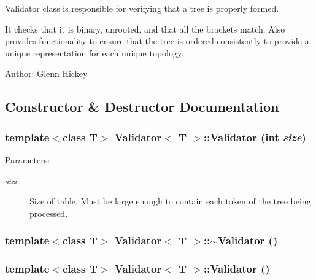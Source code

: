 Validator class is responsible for verifying that a tree is properly formed. 

It checks that it is binary, unrooted, and that all the brackets match. Also provides functionality to ensure that the tree is ordered consistently to provide a unique representation for each unique topology.

\begin{Desc}
\item[Author:]Glenn Hickey \end{Desc}




\subsection{Constructor \& Destructor Documentation}
\subsubsection{\setlength{\rightskip}{0pt plus 5cm}template$<$class T$>$ {\bf Validator}$<$ T $>$::{\bf Validator} (int {\em size})}\label{classValidator_a0}


\begin{Desc}
\item[Parameters:]
\begin{description}
\item[{\em size}]Size of table. Must be large enough to contain each token of the tree being processed. \end{description}
\end{Desc}
\subsubsection{\setlength{\rightskip}{0pt plus 5cm}template$<$class T$>$ {\bf Validator}$<$ T $>$::$\sim${\bf Validator} ()}\label{classValidator_a1}


\subsubsection{\setlength{\rightskip}{0pt plus 5cm}template$<$class T$>$ {\bf Validator}$<$ T $>$::{\bf Validator} ()\hspace{0.3cm}{\tt  [private]}}\label{classValidator_d0}




